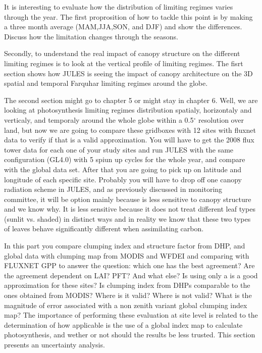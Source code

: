 \documentclass[a4paper,11pt]{report}
\begin{document}
It is interesting to evaluate how the distribution of limiting regimes varies through the year. The first proprosition of how to tackle this point is by making a three month average (MAM,JJA,SON, and DJF) and show the differences. Discuss how the limitation changes through the seasons. 

Secondly, to understand the real impact of canopy structure on the different limiting regimes is to look at the vertical profile of limiting regimes. The fisrt section shows how JULES is seeing the impact of canopy architecture on the 3D spatial and temporal Farquhar limiting regimes around the globe.

The second section might go to chapter 5 or might stay in chapter 6. Well, we are looking at photosynthesis limiting regimes distribution spatialy, horizontaly and verticaly, and temporaly around the whole globe within a 0.5$^{\circ}$ resolution over land, but now we are going to compare these gridboxes with 12 sites with fluxnet data to verify if that is a valid approximation. You will have to get the 2008 flux tower data for each one of your study sites and run JULES with the same configuration (GL4.0) with 5 spiun up cycles for the whole year, and compare with the global data set. After that you are going to pick up on latitude and longitude of each specific site. Probably you will have to drop off one canopy radiation scheme in JULES, and as previously discussed in monitoring committee, it will be option mainly because is less sensitive to canopy structure and we know why. It is less sensitive because it does not treat different leaf types (sunlit vs. shaded) in distinct ways and in reality we know that these two types of leaves behave significantly different when assimilating carbon.

In this part you compare clumping index and structure factor from DHP, and global data with clumping map from MODIS and WFDEI and comparing with FLUXNET GPP to answer the question: which one has the best agreement? Are the agreement dependent on LAI? PFT? And what else? Is using only a is a good approximation for these sites? Is clumping index from DHPs comparable to the ones obtained from MODIS? Where is it valid? Where is not valid? What is the magnitude of error associated with a non zenith variant global clumping index map? The importance of performing these evaluation at site level is related to the determination of how applicable is the use of a global index map to calculate photosynthesis, and wether or not should the results be less trusted. This section presents an uncertainty analysis.
\end{document}
